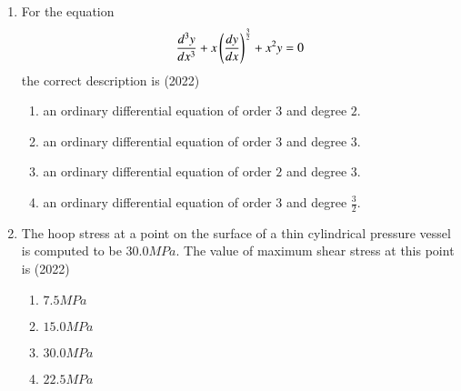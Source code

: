 \documentclass[journal]{IEEEtran}
\begin{document}
\begin{enumerate}
\item For the equation $$\frac{d^{3}y}{dx^{3}}+x\left(\frac{dy}{dx}\right)^{\frac{3}{2}}+x^{2}y=0$$ the correct description is \hfill(2022)
\begin{enumerate}
\item an ordinary differential equation of order $3$ and degree $2$.
\item an ordinary differential equation of order $3$ and degree $3$.
\item an ordinary differential equation of order $2$ and degree $3$.
\item an ordinary differential equation of order $3$ and degree $\frac{3}{2}$.
\end{enumerate}

\item The hoop stress at a point on the surface of a thin cylindrical pressure vessel is computed to be $30.0MPa$. The value of maximum shear stress at this point is \hfill(2022)
\begin{multicols}{2}
\begin{enumerate}
\item $7.5MPa$
\item $15.0MPa$
\item $30.0MPa$
\item $22.5MPa$
\end{enumerate}
\end{multicols}
\end{enumerate}
\end{document}
